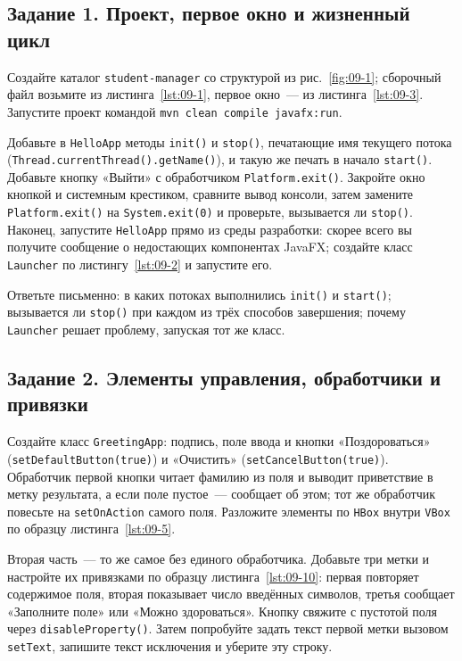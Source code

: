 \subsection*{Задание 1. Проект, первое окно и жизненный цикл}

Создайте каталог \texttt{student-manager} со структурой из рис.~\ref{fig:09-1};
сборочный файл возьмите из листинга~\ref{lst:09-1}, первое окно~--- из
листинга~\ref{lst:09-3}. Запустите проект командой
\texttt{mvn clean compile javafx:run}.

Добавьте в \texttt{HelloApp} методы \texttt{init()} и \texttt{stop()},
печатающие имя текущего потока (\texttt{Thread.currentThread().getName()}), и
такую же печать в начало \texttt{start()}. Добавьте кнопку «Выйти» с
обработчиком \texttt{Platform.exit()}. Закройте окно кнопкой и системным
крестиком, сравните вывод консоли, затем замените \texttt{Platform.exit()} на
\texttt{System.exit(0)} и проверьте, вызывается ли \texttt{stop()}. Наконец,
запустите \texttt{HelloApp} прямо из среды разработки: скорее всего вы получите
сообщение о недостающих компонентах JavaFX; создайте класс \texttt{Launcher} по
листингу~\ref{lst:09-2} и запустите его.

Ответьте письменно: в каких потоках выполнились \texttt{init()} и
\texttt{start()}; вызывается ли \texttt{stop()} при каждом из трёх способов
завершения; почему \texttt{Launcher} решает проблему, запуская тот же класс.

\subsection*{Задание 2. Элементы управления, обработчики и привязки}

Создайте класс \texttt{GreetingApp}: подпись, поле ввода и кнопки
«Поздороваться» (\texttt{setDefaultButton(true)}) и «Очистить»
(\texttt{setCancelButton(true)}). Обработчик первой кнопки читает фамилию из
поля и выводит приветствие в метку результата, а если поле пустое~--- сообщает
об этом; тот же обработчик повесьте на \texttt{setOnAction} самого поля.
Разложите элементы по \texttt{HBox} внутри \texttt{VBox} по образцу
листинга~\ref{lst:09-5}.

Вторая часть~--- то же самое без единого обработчика. Добавьте три метки и
настройте их привязками по образцу листинга~\ref{lst:09-10}: первая повторяет
содержимое поля, вторая показывает число введённых символов, третья сообщает
«Заполните поле» или «Можно здороваться». Кнопку свяжите с пустотой поля через
\texttt{disableProperty()}. Затем попробуйте задать текст первой метки вызовом
\texttt{setText}, запишите текст исключения и уберите эту строку.

